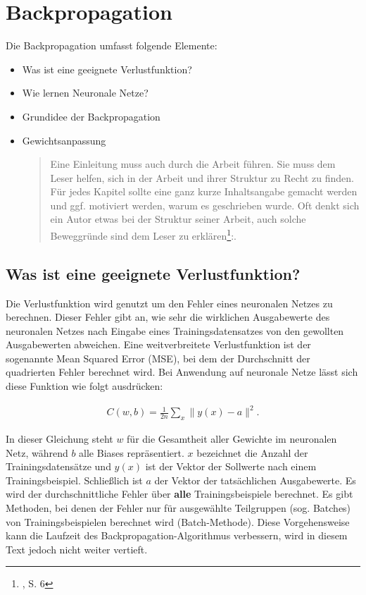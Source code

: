 \newpage
\thispagestyle{empty}
\section{Backpropagation}\label{sec:backpropagation}   

\vspace{1cm}
\begin{tcolorbox}[title={Inhalt}]
Die Backpropagation umfasst folgende Elemente:
\begin{itemize}
\item Was ist eine geeignete Verlustfunktion?
\item Wie lernen Neuronale Netze?
\item Grundidee der Backpropagation
\item Gewichtsanpassung
\begin{quotation}
Eine Einleitung muss auch durch die Arbeit führen. Sie muss dem Leser helfen, sich in der Arbeit und ihrer Struktur zu Recht zu finden. Für jedes Kapitel sollte eine ganz kurze Inhaltsangabe gemacht werden und ggf. motiviert werden, warum es geschrieben wurde. Oft denkt sich ein Autor etwas bei der Struktur seiner Arbeit, auch solche Beweggründe sind dem Leser zu erklären\footnote{\cite{BBoJ}, S. 6}:. 
\end{quotation}
\end{itemize}
\end{tcolorbox}

\subsection{Was ist eine geeignete Verlustfunktion?}\label{subsec:backpropagation:verlustfunktion}
Die Verlustfunktion wird genutzt um den Fehler eines neuronalen Netzes zu berechnen. Dieser Fehler gibt an, 
wie sehr die wirklichen Ausgabewerte des neuronalen Netzes nach Eingabe eines Trainingsdatensatzes von den gewollten Ausgabewerten abweichen. 
\bigbreak\noindent
Eine weitverbreitete Verlustfunktion ist der sogenannte Mean Squared Error (MSE), bei dem der Durchschnitt der quadrierten Fehler berechnet wird.
Bei Anwendung auf neuronale Netze lässt sich diese Funktion wie folgt ausdrücken:

\begin{eqnarray}  
  C(w,b) = \frac{1}{2n} \sum_x \| y(x) - a\|^2.
\end{eqnarray}

\noindent
In dieser Gleichung steht $w$ für die Gesamtheit aller Gewichte im neuronalen Netz, während $b$ alle Biases repräsentiert.
$x$ bezeichnet die Anzahl der Trainingsdatensätze und $y(x)$ ist der Vektor der Sollwerte nach einem Trainingsbeispiel.
Schließlich ist $a$ der Vektor der tatsächlichen Ausgabewerte. Es wird der durchschnittliche Fehler über \textbf{alle} Trainingsbeispiele berechnet. 
Es gibt Methoden, bei denen der Fehler nur für ausgewählte Teilgruppen (sog. Batches) von Trainingsbeispielen berechnet wird (Batch-Methode). 
Diese Vorgehensweise kann die Laufzeit des Backpropagation-Algorithmus verbessern, wird in diesem Text jedoch nicht weiter vertieft. 

